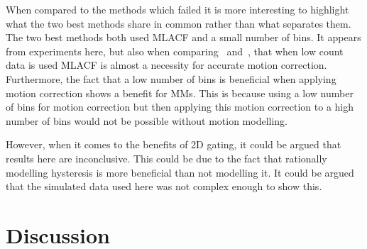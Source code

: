             When compared to the methods which failed it is more interesting to highlight what the two best methods share in common rather than what separates them. The two best methods both used \gls{MLACF} and a small number of bins. It appears from experiments here, but also when comparing~ and~, that when low count data is used \gls{MLACF} is almost a necessity for accurate motion correction. Furthermore, the fact that a low number of bins is beneficial when applying motion correction shows a benefit for \glspl{MM}. This is because using a low number of bins for motion correction but then applying this motion correction to a high number of bins would not be possible without motion modelling.
            
            However, when it comes to the benefits of \gls{2D} gating, it could be argued that results here are inconclusive. This could be due to the fact that rationally modelling hysteresis is more beneficial than not modelling it. It could be argued that the simulated data used here was not complex enough to show this.
        
    \section{Discussion} \label{sec:subsequent_motion_correction_using_advanced_reconstruction_and_gating_methods_with_more_challenging_data_discussion}
        
